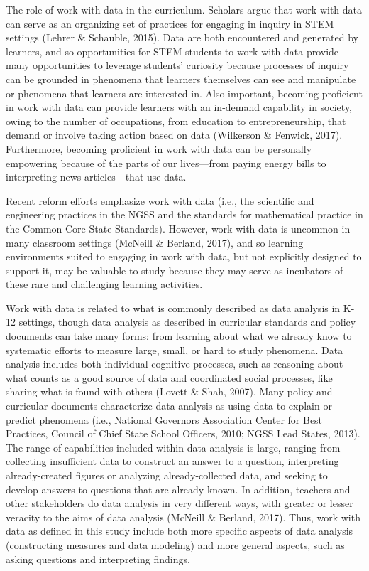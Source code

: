 \documentclass[]{book}
\theoremstyle{definition}
\theoremstyle{definition}
\theoremstyle{definition}
\theoremstyle{remark}
\begin{document}
The role of work with data in the curriculum. Scholars argue that work
with data can serve as an organizing set of practices for engaging in
inquiry in STEM settings (Lehrer \& Schauble, 2015). Data are both
encountered and generated by learners, and so opportunities for STEM
students to work with data provide many opportunities to leverage
students' curiosity because processes of inquiry can be grounded in
phenomena that learners themselves can see and manipulate or phenomena
that learners are interested in. Also important, becoming proficient in
work with data can provide learners with an in-demand capability in
society, owing to the number of occupations, from education to
entrepreneurship, that demand or involve taking action based on data
(Wilkerson \& Fenwick, 2017). Furthermore, becoming proficient in work
with data can be personally empowering because of the parts of our
lives---from paying energy bills to interpreting news articles---that
use data.

Recent reform efforts emphasize work with data (i.e., the scientific and
engineering practices in the NGSS and the standards for mathematical
practice in the Common Core State Standards). However, work with data is
uncommon in many classroom settings (McNeill \& Berland, 2017), and so
learning environments suited to engaging in work with data, but not
explicitly designed to support it, may be valuable to study because they
may serve as incubators of these rare and challenging learning
activities.

Work with data is related to what is commonly described as data analysis
in K-12 settings, though data analysis as described in curricular
standards and policy documents can take many forms: from learning about
what we already know to systematic efforts to measure large, small, or
hard to study phenomena. Data analysis includes both individual
cognitive processes, such as reasoning about what counts as a good
source of data and coordinated social processes, like sharing what is
found with others (Lovett \& Shah, 2007). Many policy and curricular
documents characterize data analysis as using data to explain or predict
phenomena (i.e., National Governors Association Center for Best
Practices, Council of Chief State School Officers, 2010; NGSS Lead
States, 2013). The range of capabilities included within data analysis
is large, ranging from collecting insufficient data to construct an
answer to a question, interpreting already-created figures or analyzing
already-collected data, and seeking to develop answers to questions that
are already known. In addition, teachers and other stakeholders do data
analysis in very different ways, with greater or lesser veracity to the
aims of data analysis (McNeill \& Berland, 2017). Thus, work with data
as defined in this study include both more specific aspects of data
analysis (constructing measures and data modeling) and more general
aspects, such as asking questions and interpreting findings.
\end{document}
